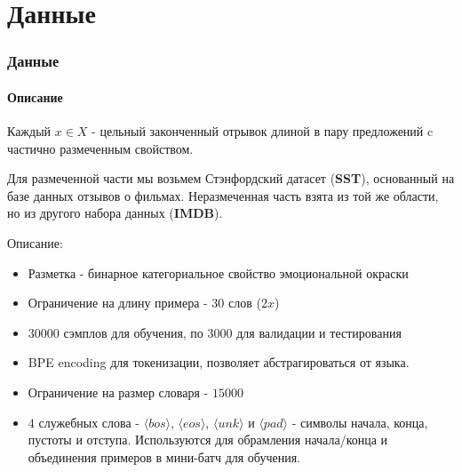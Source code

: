 \documentclass[10pt]{beamer}
\begin{document}
\section{Данные}
\begin{frame}
\frametitle{Данные}
\framesubtitle{Описание}


Каждый $x \in X$ - цельный законченный отрывок длиной в пару предложений c частично размеченным свойством. 

Для размеченной части мы возьмем Стэнфордский датасет (\textbf{SST}), основанный на базе данных отзывов о фильмах. Неразмеченная часть взята из той же области, но из другого набора данных (\textbf{IMDB}).

\vskip3mm

\newcommand{\bos}{\langle bos \rangle}
\newcommand{\eos}{\langle eos \rangle}
\newcommand{\unk}{\langle unk \rangle}
\newcommand{\pad}{\langle pad \rangle}

Описание:
\begin{itemize}
    \item Разметка - бинарное категориальное свойство эмоциональной окраски
    \item Ограничение на длину примера - $30$ слов ($2x$)
    \item $30000$ сэмплов для обучения, по $3000$ для валидации и тестирования
    \item BPE encoding для токенизации, позволяет абстрагироваться от языка.
    \item Ограничение на размер словаря - $15000$
    \item $4$ служебных слова - $\bos$, $\eos$, $\unk$ и $\pad$ - символы начала, конца, пустоты и отступа. Используются для обрамления начала/конца и объединения примеров в мини-батч для обучения.
\end{itemize}

\end{frame}
\end{document}
